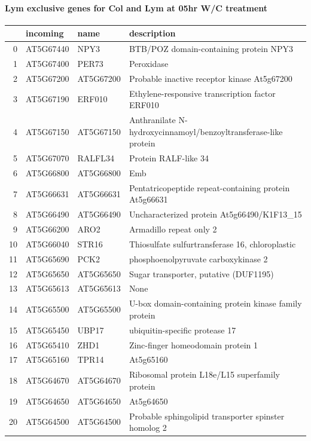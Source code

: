 \documentclass[11pt]{article}
\begin{document}
\paragraph{Lym exclusive genes for Col and Lym at 05hr W/C treatment}
\label{sec:org3f7537a}
\begin{center}
\begin{tabular}{rlll}
 & incoming & name & description\\
\hline
0 & AT5G67440 & NPY3 & BTB/POZ domain-containing protein NPY3\\
1 & AT5G67400 & PER73 & Peroxidase\\
2 & AT5G67200 & AT5G67200 & Probable inactive receptor kinase At5g67200\\
3 & AT5G67190 & ERF010 & Ethylene-responsive transcription factor ERF010\\
4 & AT5G67150 & AT5G67150 & Anthranilate N-hydroxycinnamoyl/benzoyltransferase-like protein\\
5 & AT5G67070 & RALFL34 & Protein RALF-like 34\\
6 & AT5G66800 & AT5G66800 & Emb\\
7 & AT5G66631 & AT5G66631 & Pentatricopeptide repeat-containing protein At5g66631\\
8 & AT5G66490 & AT5G66490 & Uncharacterized protein At5g66490/K1F13\_15\\
9 & AT5G66200 & ARO2 & Armadillo repeat only 2\\
10 & AT5G66040 & STR16 & Thiosulfate sulfurtransferase 16, chloroplastic\\
11 & AT5G65690 & PCK2 & phosphoenolpyruvate carboxykinase 2\\
12 & AT5G65650 & AT5G65650 & Sugar transporter, putative (DUF1195)\\
13 & AT5G65613 & AT5G65613 & None\\
14 & AT5G65500 & AT5G65500 & U-box domain-containing protein kinase family protein\\
15 & AT5G65450 & UBP17 & ubiquitin-specific protease 17\\
16 & AT5G65410 & ZHD1 & Zinc-finger homeodomain protein 1\\
17 & AT5G65160 & TPR14 & At5g65160\\
18 & AT5G64670 & AT5G64670 & Ribosomal protein L18e/L15 superfamily protein\\
19 & AT5G64650 & AT5G64650 & At5g64650\\
20 & AT5G64500 & AT5G64500 & Probable sphingolipid transporter spinster homolog 2\\

\end{tabular}
\end{center}
\end{document}
